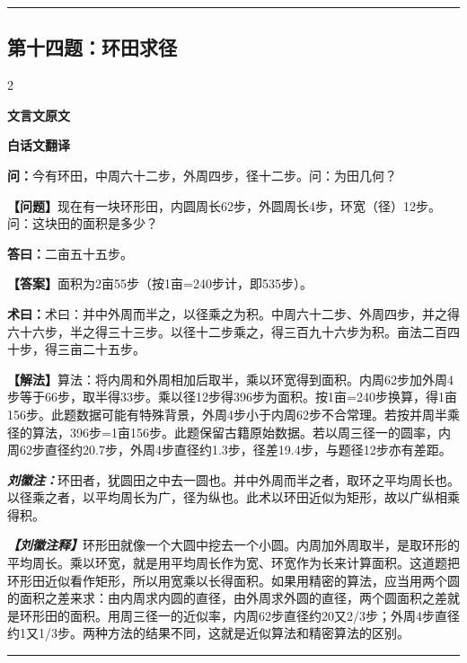 \documentclass[10pt,a4paper]{article}
\newcommand{\wen}[1]{\textbf{\color{problemcolor}问：}#1\par}
\newcommand{\da}[1]{\textbf{答曰：}#1\par}
\newcommand{\shu}[1]{\textbf{术曰：}#1\par}
\newcommand{\liuhui}[1]{{\color{commentarycolor}\textit{\textbf{刘徽注：}}#1\par}}
\newcommand{\classicalheader}[1]{{\centering\large\bfseries\color{classicalcolor} #1\par\vspace{0.5em}}}
\newcommand{\wenmodern}[1]{\textbf{\color{moderncolor}【问题】}#1\par}
\newcommand{\damodern}[1]{\textbf{【答案】}#1\par}
\newcommand{\shumodern}[1]{\textbf{【解法】}#1\par}
\newcommand{\liuhuimodern}[1]{{\color{commentarycolor}\textit{\textbf{【刘徽注释】}}#1\par}}
\newcommand{\modernheader}[1]{{\centering\large\bfseries\color{moderncolor} #1\par\vspace{0.5em}}}
\newcommand{\problemsec}[1]{\subsection*{#1}}
\begin{document}
\vspace{0.3cm}
\hrule
\vspace{0.3cm}

\problemsec{第十四题：环田求径}
\begin{paracol}{2}
\classicalheader{文言文原文}
\switchcolumn
\modernheader{白话文翻译}
\switchcolumn*

\wen{今有环田，中周六十二步，外周四步，径十二步。问：为田几何？}

\switchcolumn

\wenmodern{现在有一块环形田，内圆周长62步，外圆周长4步，环宽（径）12步。问：这块田的面积是多少？}

\switchcolumn*

\da{二亩五十五步。}

\switchcolumn

\damodern{面积为2亩55步（按1亩=240步计，即535步）。}

\switchcolumn*

\shu{术曰：并中外周而半之，以径乘之为积。中周六十二步、外周四步，并之得六十六步，半之得三十三步。以径十二步乘之，得三百九十六步为积。亩法二百四十步，得三亩二十五步。}

\switchcolumn

\shumodern{算法：将内周和外周相加后取半，乘以环宽得到面积。内周62步加外周4步等于66步，取半得33步。乘以径12步得396步为面积。按1亩=240步换算，得1亩156步。此题数据可能有特殊背景，外周4步小于内周62步不合常理。若按并周半乘径的算法，396步=1亩156步。此题保留古籍原始数据。若以周三径一的圆率，内周62步直径约20.7步，外周4步直径约1.3步，径差19.4步，与题径12步亦有差距。}

\switchcolumn*

\liuhui{环田者，犹圆田之中去一圆也。并中外周而半之者，取环之平均周长也。以径乘之者，以平均周长为广，径为纵也。此术以环田近似为矩形，故以广纵相乘得积。}

\switchcolumn

\liuhuimodern{环形田就像一个大圆中挖去一个小圆。内周加外周取半，是取环形的平均周长。乘以环宽，就是用平均周长作为宽、环宽作为长来计算面积。这道题把环形田近似看作矩形，所以用宽乘以长得面积。如果用精密的算法，应当用两个圆的面积之差来求：由内周求内圆的直径，由外周求外圆的直径，两个圆面积之差就是环形田的面积。用周三径一的近似率，内周62步直径约20又2/3步；外周4步直径约1又1/3步。两种方法的结果不同，这就是近似算法和精密算法的区别。}

\end{paracol}

\vspace{0.3cm}
\hrule
\vspace{0.3cm}
\end{document}
